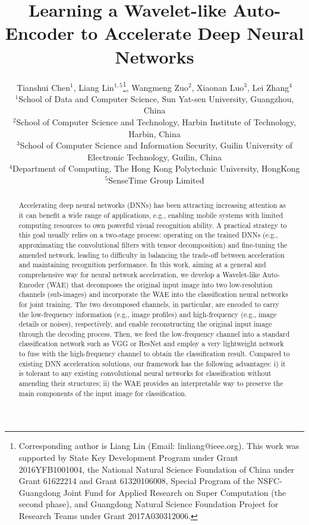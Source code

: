 \documentclass[letterpaper]{article} %
\begin{document}
%
\title{Learning a Wavelet-like Auto-Encoder to Accelerate Deep Neural Networks}
\author{Tianshui Chen$^1$, Liang Lin$^{1,5}$\thanks{Corresponding author is Liang Lin (Email: linliang@ieee.org). This work was supported by State Key Development Program under Grant 2016YFB1001004, the National Natural
Science Foundation of China under Grant 61622214 and Grant 61320106008, Special Program of the NSFC-Guangdong Joint Fund for Applied Research on Super Computation (the second phase), and Guangdong Natural Science Foundation Project for Research Teams under Grant 2017A030312006.}, Wangmeng Zuo$^2$, Xiaonan Luo$^3$, Lei Zhang$^4$\\
$^1$School of Data and Computer Science, Sun Yat-sen University, Guangzhou, China\\
$^2$School of Computer Science and Technology, Harbin Institute of Technology, Harbin, China\\
$^3$School of Computer Science and Information Security, Guilin University of Electronic Technology, Guilin, China\\
$^4$Department of Computing, The Hong Kong Polytechnic University, HongKong\\
$^5$SenseTime Group Limited \\
}
\maketitle
\begin{abstract}
Accelerating deep neural networks (DNNs) has been attracting increasing attention as it can benefit a wide range of applications, e.g., enabling mobile systems with limited computing resources to own powerful visual recognition ability. A practical strategy to this goal usually relies on a two-stage process: operating on the trained DNNs (e.g., approximating the convolutional filters with tensor decomposition) and fine-tuning the amended network, leading to difficulty in balancing the trade-off between acceleration and maintaining recognition performance. In this work, aiming at a general and comprehensive way for neural network acceleration, we develop a Wavelet-like Auto-Encoder (WAE) that decomposes the original input image into two low-resolution channels (sub-images) and incorporate the WAE into the classification neural networks for joint training. The two decomposed channels, in particular, are encoded to carry the low-frequency information (e.g., image profiles) and high-frequency (e.g., image details or noises), respectively, and enable reconstructing the original input image through the decoding process. Then, we feed the low-frequency channel into a standard classification network such as VGG or ResNet and employ a very lightweight network to fuse with the high-frequency channel to obtain the classification result. Compared to existing DNN acceleration solutions, our framework has the following advantages: i) it is tolerant to any existing convolutional neural networks for classification without amending their structures; ii) the WAE provides an interpretable way to preserve the main components of the input image for classification.
\end{abstract}
\end{document}
